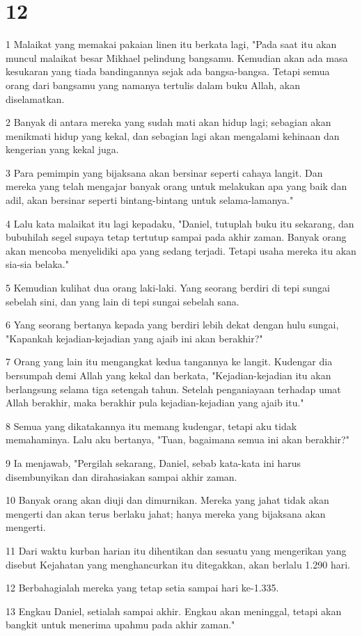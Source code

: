 \chapter{12}

\par 1 Malaikat yang memakai pakaian linen itu berkata lagi, "Pada saat itu akan muncul malaikat besar Mikhael pelindung bangsamu. Kemudian akan ada masa kesukaran yang tiada bandingannya sejak ada bangsa-bangsa. Tetapi semua orang dari bangsamu yang namanya tertulis dalam buku Allah, akan diselamatkan.
\par 2 Banyak di antara mereka yang sudah mati akan hidup lagi; sebagian akan menikmati hidup yang kekal, dan sebagian lagi akan mengalami kehinaan dan kengerian yang kekal juga.
\par 3 Para pemimpin yang bijaksana akan bersinar seperti cahaya langit. Dan mereka yang telah mengajar banyak orang untuk melakukan apa yang baik dan adil, akan bersinar seperti bintang-bintang untuk selama-lamanya."
\par 4 Lalu kata malaikat itu lagi kepadaku, "Daniel, tutuplah buku itu sekarang, dan bubuhilah segel supaya tetap tertutup sampai pada akhir zaman. Banyak orang akan mencoba menyelidiki apa yang sedang terjadi. Tetapi usaha mereka itu akan sia-sia belaka."
\par 5 Kemudian kulihat dua orang laki-laki. Yang seorang berdiri di tepi sungai sebelah sini, dan yang lain di tepi sungai sebelah sana.
\par 6 Yang seorang bertanya kepada yang berdiri lebih dekat dengan hulu sungai, "Kapankah kejadian-kejadian yang ajaib ini akan berakhir?"
\par 7 Orang yang lain itu mengangkat kedua tangannya ke langit. Kudengar dia bersumpah demi Allah yang kekal dan berkata, "Kejadian-kejadian itu akan berlangsung selama tiga setengah tahun. Setelah penganiayaan terhadap umat Allah berakhir, maka berakhir pula kejadian-kejadian yang ajaib itu."
\par 8 Semua yang dikatakannya itu memang kudengar, tetapi aku tidak memahaminya. Lalu aku bertanya, "Tuan, bagaimana semua ini akan berakhir?"
\par 9 Ia menjawab, "Pergilah sekarang, Daniel, sebab kata-kata ini harus disembunyikan dan dirahasiakan sampai akhir zaman.
\par 10 Banyak orang akan diuji dan dimurnikan. Mereka yang jahat tidak akan mengerti dan akan terus berlaku jahat; hanya mereka yang bijaksana akan mengerti.
\par 11 Dari waktu kurban harian itu dihentikan dan sesuatu yang mengerikan yang disebut Kejahatan yang menghancurkan itu ditegakkan, akan berlalu 1.290 hari.
\par 12 Berbahagialah mereka yang tetap setia sampai hari ke-1.335.
\par 13 Engkau Daniel, setialah sampai akhir. Engkau akan meninggal, tetapi akan bangkit untuk menerima upahmu pada akhir zaman."


